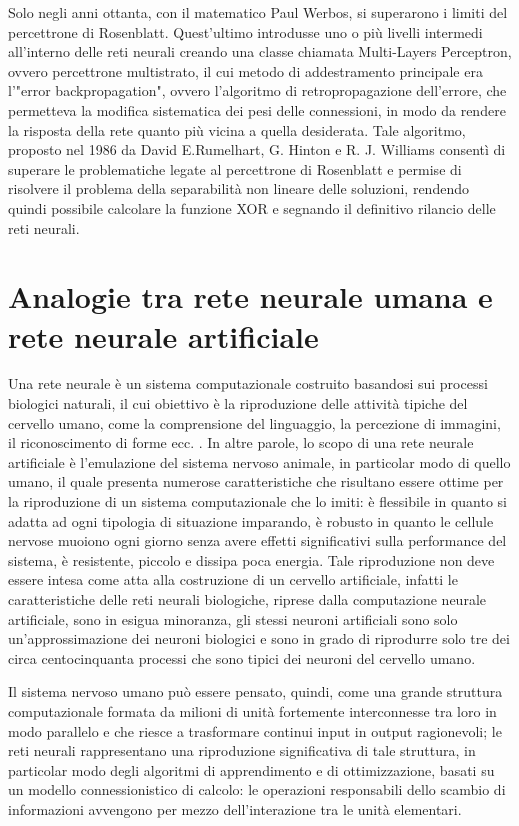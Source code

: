 \documentclass[12pt,a4paper,oneside]{book}
\begin{document}
		Solo negli anni ottanta, con il matematico Paul Werbos, si superarono i limiti del percettrone di Rosenblatt.  Quest'ultimo introdusse uno o più livelli intermedi all'interno delle reti neurali creando una classe chiamata  Multi-Layers Perceptron, ovvero percettrone multistrato, il cui metodo di addestramento principale era l'"error backpropagation", ovvero l'algoritmo di retropropagazione dell'errore, che permetteva la modifica sistematica dei pesi delle connessioni, in modo da rendere la risposta della rete quanto più vicina a quella desiderata.
		Tale algoritmo, proposto nel 1986 da David E.Rumelhart, G. Hinton e R. J. Williams consentì di superare le problematiche legate al percettrone di Rosenblatt e permise di risolvere il problema della separabilità non lineare delle soluzioni, rendendo quindi possibile calcolare la funzione XOR e segnando il definitivo rilancio delle reti neurali.
		
		
		\section{Analogie tra rete neurale umana e rete neurale artificiale}
	
		Una rete neurale è un sistema computazionale costruito basandosi sui processi biologici naturali, il cui obiettivo è la riproduzione delle attività tipiche del cervello umano, come la comprensione del linguaggio, la percezione di immagini, il riconoscimento di forme ecc. .
		In altre parole, lo scopo di una rete neurale artificiale è l’emulazione del sistema nervoso animale, in particolar modo di quello umano, il quale presenta numerose caratteristiche che risultano essere ottime per la riproduzione di un sistema computazionale che lo imiti: è flessibile in quanto si adatta ad ogni tipologia di situazione imparando, è robusto in quanto le cellule nervose muoiono ogni giorno senza avere effetti significativi sulla performance del sistema, è resistente, piccolo e dissipa poca energia. 
		Tale riproduzione non deve essere intesa come atta alla costruzione di un cervello artificiale, infatti le caratteristiche delle reti neurali biologiche, riprese dalla computazione neurale artificiale, sono in esigua minoranza, gli stessi neuroni artificiali sono solo un’approssimazione dei neuroni biologici e sono in grado di riprodurre solo tre dei circa centocinquanta processi che sono tipici dei neuroni del cervello umano. 
	
		Il sistema nervoso umano può essere pensato, quindi, come una grande struttura computazionale formata da milioni di unità fortemente interconnesse tra loro in modo parallelo e che riesce a trasformare continui input in output ragionevoli; le reti neurali rappresentano una riproduzione significativa di tale struttura, in particolar modo degli algoritmi di apprendimento e di ottimizzazione, basati su un modello connessionistico di calcolo: le operazioni responsabili dello scambio di informazioni avvengono per mezzo dell'interazione tra le unità elementari.
		
\end{document}
